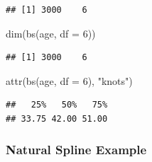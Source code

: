 \documentclass[
]{book}
\newenvironment{Shaded}{\begin{snugshade}}{\end{snugshade}}
\newcommand{\AttributeTok}[1]{\textcolor[rgb]{0.77,0.63,0.00}{#1}}
\newcommand{\CommentTok}[1]{\textcolor[rgb]{0.56,0.35,0.01}{\textit{#1}}}
\newcommand{\DecValTok}[1]{\textcolor[rgb]{0.00,0.00,0.81}{#1}}
\newcommand{\FunctionTok}[1]{\textcolor[rgb]{0.00,0.00,0.00}{#1}}
\newcommand{\NormalTok}[1]{#1}
\newcommand{\OtherTok}[1]{\textcolor[rgb]{0.56,0.35,0.01}{#1}}
\newcommand{\SpecialCharTok}[1]{\textcolor[rgb]{0.00,0.00,0.00}{#1}}
\newcommand{\StringTok}[1]{\textcolor[rgb]{0.31,0.60,0.02}{#1}}
\begin{document}
\begin{verbatim}
## [1] 3000    6
\end{verbatim}

\begin{Shaded}
\begin{Highlighting}[]
\FunctionTok{dim}\NormalTok{(}\FunctionTok{bs}\NormalTok{(age, }\AttributeTok{df =} \DecValTok{6}\NormalTok{))}
\end{Highlighting}
\end{Shaded}

\begin{verbatim}
## [1] 3000    6
\end{verbatim}

\begin{Shaded}
\begin{Highlighting}[]
\FunctionTok{attr}\NormalTok{(}\FunctionTok{bs}\NormalTok{(age, }\AttributeTok{df =} \DecValTok{6}\NormalTok{), }\StringTok{"knots"}\NormalTok{)}
\end{Highlighting}
\end{Shaded}

\begin{verbatim}
##   25%   50%   75% 
## 33.75 42.00 51.00
\end{verbatim}

\hypertarget{natural-spline-example}{%
\subsubsection{Natural Spline Example}\label{natural-spline-example}}

\begin{Shaded}
\end{Shaded}
\end{document}

